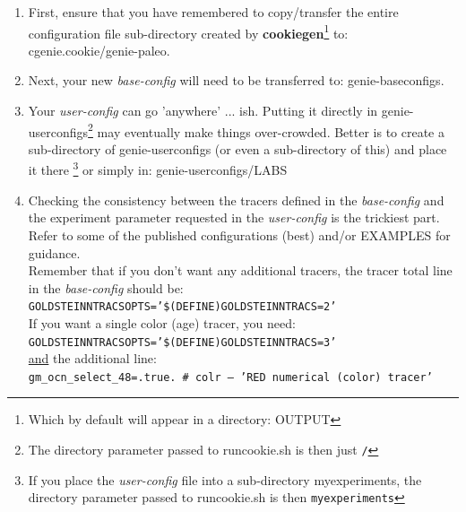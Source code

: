 \begin{enumerate}[noitemsep]
\vspace{1mm}
\item First, ensure that you have remembered to copy/transfer the entire configuration file sub-directory created by \textbf{cookiegen}\footnote{Which by default will appear in a directory: \textsf{\footnotesize OUTPUT}} to: \textsf{\footnotesize cgenie.cookie/genie-paleo}.
\vspace{1mm}
\item Next, your new \textit{base-config} will need to be transferred to: \textsf{\footnotesize genie-baseconfigs}.
\vspace{1mm}
\item Your \textit{user-config} can go 'anywhere' ... ish. Putting it directly in \textsf{\footnotesize genie-userconfigs}\footnote{The directory parameter passed to \textsf{\footnotesize runcookie.sh} is then just \texttt{/}} may eventually make things over-crowded. Better is to create a sub-directory of \textsf{\footnotesize genie-userconfigs} (or even a sub-directory of this) and place it there \footnote{If you place the \textit{user-config} file into a sub-directory  \textsf{\footnotesize myexperiments}, the directory parameter passed to \textsf{\footnotesize runcookie.sh} is then \texttt{myexperiments}} or simply in: \textsf{\footnotesize genie-userconfigs/LABS}
\vspace{1mm}
\item Checking the consistency between the tracers defined in the \textit{base-config} and the experiment parameter requested in the \textit{user-config} is the trickiest part. Refer to some of the published configurations (best) and/or EXAMPLES for guidance.
\vspace{1mm}
\\Remember that if you don't want any additional tracers, the tracer total line in the \textit{base-config} should be:
\\\texttt{\small GOLDSTEINNTRACSOPTS='\$(DEFINE)GOLDSTEINNTRACS=2'}
\vspace{1mm}
\\If you want a single color (age) tracer, you need:
\\\texttt{\small GOLDSTEINNTRACSOPTS='\$(DEFINE)GOLDSTEINNTRACS=3'}
\\\uline{and} the additional line:
\\\texttt{\small gm\_ocn\_select\_48=.true.     \#   colr -- 'RED numerical (color) tracer'} 
\vspace{1mm}

\end{enumerate}
